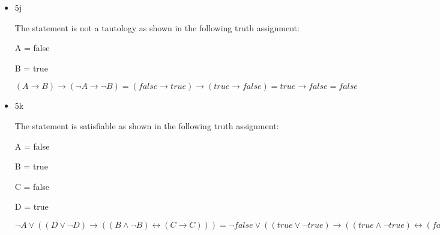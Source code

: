 \documentclass{article}
\begin{document}
\begin{itemize}
\begin{itemize}
        A = true

        B = true

        $(A \rightarrow B) \rightarrow (\neg A \rightarrow \neg B) = (true \rightarrow true) = true$
        \item 5j
        
        The statement is not a tautology as shown in the following truth assignment:
        
        A = false

        B = true

        $(A \rightarrow B) \rightarrow (\neg A \rightarrow \neg B) = (false \rightarrow true) \rightarrow (true \rightarrow false) = true \rightarrow false = false$
        \item 5k
        
        The statement is satisfiable as shown in the following truth assignment:

        A = false

        B = true

        C = false

        D = true

        $\neg A \lor ((D \lor \neg D) \rightarrow ((B \land \neg B) \leftrightarrow (C \rightarrow C))) = \neg false \lor ((true \lor \neg true) \rightarrow ((true \land \neg true) \leftrightarrow (false \rightarrow false))) = true \lor (true \rightarrow (false \leftrightarrow true)) = true$
    \end{itemize}
\end{itemize}
\end{document}
